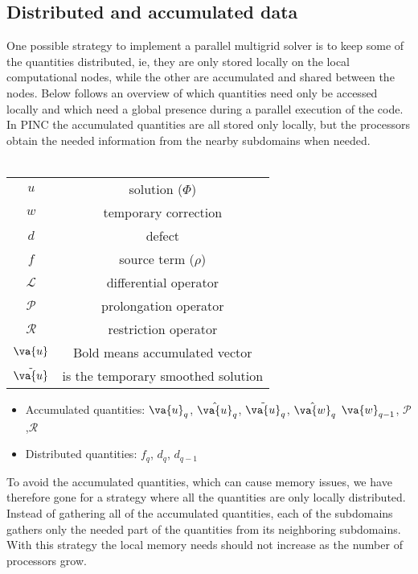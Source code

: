 	\subsection{Distributed and accumulated data}
		One possible strategy to implement a parallel multigrid solver is to keep
		some of the quantities distributed, ie, they are only stored locally
		on the local computational nodes, while the other are accumulated and
		shared between the nodes. Below follows an overview of which quantities
		need only be accessed locally and which need a global presence
		during a parallel execution of the code. In PINC the accumulated quantities
 		are all stored only locally, but the processors obtain the needed information
		from the nearby subdomains when needed.
	\\	\\
		\begin{tabular} {c c}
			\(u\) & solution (\(\Phi\))
			\\
			\(w\) & temporary correction
			\\
			\(d\) & defect \\
			\(f\) & source term (\(\rho\)) \\
			\(\mathcal{L}\) & differential operator \\
			\(\mathcal{P}\) & prolongation operator \\
			\(\mathcal{R}\) & restriction operator \\
			 \( \va{u}\) & Bold means accumulated vector \\
			\( \tilde{\va{ u }} \) & is the temporary smoothed solution
		\end{tabular}

		\begin{itemize}
			\item Accumulated quantities:	\(\va{u}_q\), \( \hat{\va{u}}_q \), \(\tilde{\va{u}}_q\), \(\hat{\va{w}}_q\) \(\va{w}_{q-1}\), \(\mathcal{P}\),\(\mathcal{R}\)
			\item Distributed quantities:  \( f_q \), \(d_q\), \(d_{q-1}\)
		\end{itemize}

		To avoid the accumulated quantities, which can cause memory issues, we have therefore
		gone for a strategy where all the quantities are only locally distributed.
		Instead of gathering all of the accumulated quantities, each of the subdomains
		gathers only the needed part of the quantities from its neighboring subdomains.
		With this strategy the local memory needs should not increase as the number
		of processors grow.

